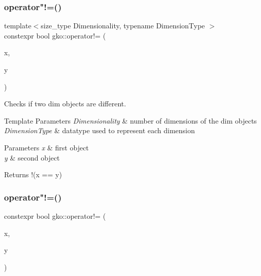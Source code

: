 \subsubsection{\texorpdfstring{operator"!=()}{operator!=()}\hspace{0.1cm}{\footnotesize\ttfamily [2/3]}}
{\footnotesize\ttfamily template$<$size\+\_\+type Dimensionality, typename Dimension\+Type $>$ \\
constexpr bool gko\+::operator!= (\begin{DoxyParamCaption}\item[{const \hyperlink{structgko_1_1dim}{dim}$<$ Dimensionality, Dimension\+Type $>$ \&}]{x,  }\item[{const \hyperlink{structgko_1_1dim}{dim}$<$ Dimensionality, Dimension\+Type $>$ \&}]{y }\end{DoxyParamCaption})\hspace{0.3cm}{\ttfamily [inline]}}



Checks if two dim objects are different. 


\begin{DoxyTemplParams}{Template Parameters}
{\em Dimensionality} & number of dimensions of the dim objects \\
\hline
{\em Dimension\+Type} & datatype used to represent each dimension\\
\hline
\end{DoxyTemplParams}

\begin{DoxyParams}{Parameters}
{\em x} & first object \\
\hline
{\em y} & second object\\
\hline
\end{DoxyParams}
\begin{DoxyReturn}{Returns}
{\ttfamily !(x == y)} 
\end{DoxyReturn}
\mbox{\label{namespacegko_a61d408b4cd77aae6cac7a40c8307fddb}} 
\subsubsection{\texorpdfstring{operator"!=()}{operator!=()}\hspace{0.1cm}{\footnotesize\ttfamily [3/3]}}
{\footnotesize\ttfamily constexpr bool gko\+::operator!= (\begin{DoxyParamCaption}\item[{\hyperlink{classgko_1_1precision__reduction}{precision\+\_\+reduction}}]{x,  }\item[{\hyperlink{classgko_1_1precision__reduction}{precision\+\_\+reduction}}]{y }\end{DoxyParamCaption})\hspace{0.3cm}{\ttfamily [noexcept]}}



